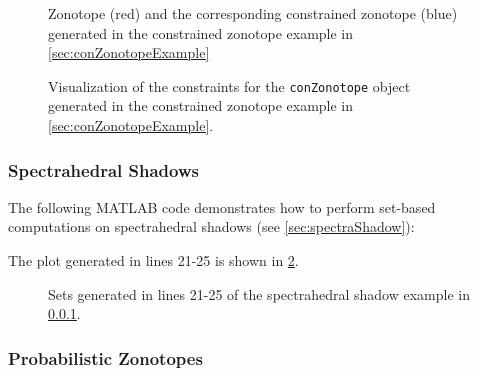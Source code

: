 \begin{figure}[h!tb]
\begin{minipage}{0.45\columnwidth}
  \centering
  \caption{Zonotope (red) and the corresponding constrained zonotope (blue) generated in the constrained zonotope example in \cref{sec:conZonotopeExample}}
  \label{fig:conZonoExample_1}
\end{minipage}
\hspace{0.08\columnwidth}
\begin{minipage}{0.45\columnwidth}
  \centering
  \caption{Visualization of the constraints for the \texttt{conZonotope} object generated in the constrained zonotope example in \cref{sec:conZonotopeExample}.}
  \label{fig:conZonoExample_2}
\end{minipage}
\end{figure}


\newpage
\subsubsection{Spectrahedral Shadows}	\label{sec:spectraShadowExample}

The following MATLAB code demonstrates how to perform set-based computations on spectrahedral shadows (see \cref{sec:spectraShadow}):

{\small
	}

The plot generated in lines 21-25 is shown in \cref{fig:spectraShadowExample}.

\begin{figure}[h!tb]
	\centering
	\caption{Sets generated in lines 21-25 of the spectrahedral shadow example in \cref{sec:spectraShadowExample}.}
	\label{fig:spectraShadowExample}
\end{figure}




\subsubsection{Probabilistic Zonotopes}		\label{sec:probZonotopeExample}

